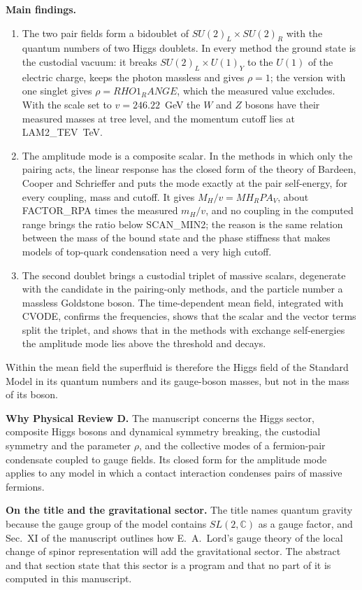 \documentclass[11pt]{article}
\begin{document}
\textbf{Main findings.}
\begin{enumerate}
\item The two pair fields form a bidoublet of $SU(2)_L\times SU(2)_R$ with the quantum numbers of two Higgs doublets. In
every method the ground state is the custodial vacuum: it breaks $SU(2)_L\times U(1)_Y$ to the $U(1)$ of the electric
charge, keeps the photon massless and gives $\rho=1$; the version with one singlet gives $\rho={{RHO1_RANGE}}$, which the
measured value excludes. With the scale set to $v=246.22$~GeV the $W$ and $Z$ bosons have their measured masses at tree
level, and the momentum cutoff lies at {{LAM2_TEV}}~TeV.
\item The amplitude mode is a composite scalar. In the methods in which only the pairing acts, the linear response has
the closed form of the theory of Bardeen, Cooper and Schrieffer and puts the mode exactly at the pair self-energy, for
every coupling, mass and cutoff. It gives $M_H/v={{MH_RPA_V}}$, about {{FACTOR_RPA}} times the measured $m_H/v$, and no
coupling in the computed range brings the ratio below {{SCAN_MIN2}}; the reason is the same relation between the mass of
the bound state and the phase stiffness that makes models of top-quark condensation need a very high cutoff.
\item The second doublet brings a custodial triplet of massive scalars, degenerate with the candidate in the pairing-only
methods, and the particle number a massless Goldstone boson. The time-dependent mean field, integrated with CVODE,
confirms the frequencies, shows that the scalar and the vector terms split the triplet, and shows that in the methods
with exchange self-energies the amplitude mode lies above the threshold and decays.
\end{enumerate}
Within the mean field the superfluid is therefore the Higgs field of the Standard Model in its quantum numbers and its
gauge-boson masses, but not in the mass of its boson.

\textbf{Why Physical Review D.} The manuscript concerns the Higgs sector, composite Higgs bosons and dynamical symmetry
breaking, the custodial symmetry and the parameter $\rho$, and the collective modes of a fermion-pair condensate
coupled to gauge fields. Its closed form for the amplitude mode applies to any model in which a contact interaction
condenses pairs of massive fermions.

\textbf{On the title and the gravitational sector.} The title names quantum gravity because the gauge group of the model
contains $SL(2,\mathbb C)$ as a gauge factor, and Sec.~XI of the manuscript outlines how E.~A.~Lord's gauge theory of the
local change of spinor representation will add the gravitational sector. The abstract and that section state that this
sector is a program and that no part of it is computed in this manuscript.
\end{document}
